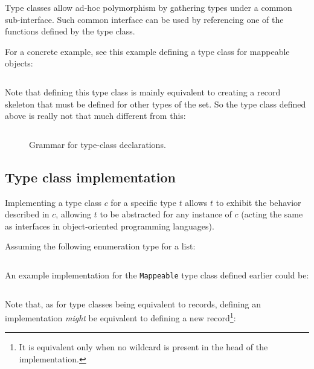 Type classes allow ad-hoc polymorphism by gathering types under a common sub-interface.
Such common interface can be used by referencing one of the functions defined by the type class.

For a concrete example, see this example defining a type class for mappeable objects:

\noindent\inputminted{\zilchlexer}{examples/mappeable-class.zc}
\vspace*{\baselineskip}

Note that defining this type class is mainly equivalent to creating a record skeleton that must be defined for other types of the set.
So the type class defined above is really not that much different from this:

\noindent\inputminted{\zilchlexer}{examples/class-record-equivalent.zc}

\begin{figure}[H]
	\centering


	\caption{Grammar for type-class declarations.}
	\label{fig:zilch-grammar-declarations-typeclass-grammar}
\end{figure}

\subsection{Type class implementation}\label{subsec:zilch-grammar-declarations-implementation}

Implementing a type class $c$ for a specific type $t$ allows $t$ to exhibit the behavior described in $c$, allowing $t$ to be abstracted for any instance of $c$ (acting the same as interfaces in object-oriented programming languages).

Assuming the following enumeration type for a list:

\noindent\inputminted{\zilchlexer}{examples/enum-list.zc}
\vspace*{\baselineskip}

\noindent An example implementation for the \verb|Mappeable| type class defined earlier could be:

\noindent\inputminted{\zilchlexer}{examples/impl-mappeable-list.zc}
\vspace*{\baselineskip}

Note that, as for type classes being equivalent to records, defining an implementation \textit{might} be equivalent to defining a new record\footnote{It is equivalent only when no wildcard is present in the head of the implementation.}:

